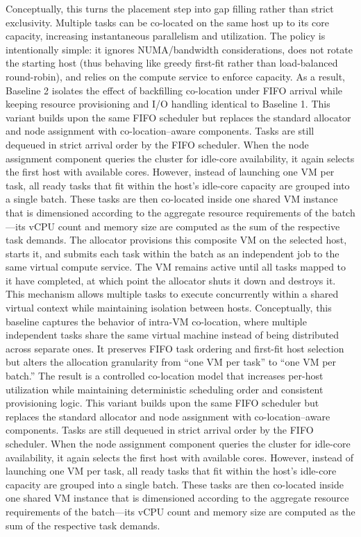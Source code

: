 Conceptually, this turns the placement step into gap filling rather than strict exclusivity. Multiple tasks can be co-located on the same host up to its core capacity, increasing instantaneous parallelism and utilization. The policy is intentionally simple: it ignores NUMA/bandwidth considerations, does not rotate the starting host (thus behaving like greedy first-fit rather than load-balanced round-robin), and relies on the compute service to enforce capacity. As a result, Baseline 2 isolates the effect of backfilling co-location under FIFO arrival while keeping resource provisioning and I/O handling identical to Baseline 1.
This variant builds upon the same FIFO scheduler but replaces the standard allocator and node assignment with co-location–aware components. Tasks are still dequeued in strict arrival order by the FIFO scheduler. When the node assignment component queries the cluster for idle-core availability, it again selects the first host with available cores. However, instead of launching one VM per task, all ready tasks that fit within the host’s idle-core capacity are grouped into a single batch. These tasks are then co-located inside one shared VM instance that is dimensioned according to the aggregate resource requirements of the batch—its vCPU count and memory size are computed as the sum of the respective task demands.
The allocator provisions this composite VM on the selected host, starts it, and submits each task within the batch as an independent job to the same virtual compute service. The VM remains active until all tasks mapped to it have completed, at which point the allocator shuts it down and destroys it. This mechanism allows multiple tasks to execute concurrently within a shared virtual context while maintaining isolation between hosts.
Conceptually, this baseline captures the behavior of intra-VM co-location, where multiple independent tasks share the same virtual machine instead of being distributed across separate ones. It preserves FIFO task ordering and first-fit host selection but alters the allocation granularity from “one VM per task” to “one VM per batch.” The result is a controlled co-location model that increases per-host utilization while maintaining deterministic scheduling order and consistent provisioning logic.
This variant builds upon the same FIFO scheduler but replaces the standard allocator and node assignment with co-location–aware components. Tasks are still dequeued in strict arrival order by the FIFO scheduler. When the node assignment component queries the cluster for idle-core availability, it again selects the first host with available cores. However, instead of launching one VM per task, all ready tasks that fit within the host’s idle-core capacity are grouped into a single batch. These tasks are then co-located inside one shared VM instance that is dimensioned according to the aggregate resource requirements of the batch—its vCPU count and memory size are computed as the sum of the respective task demands.
